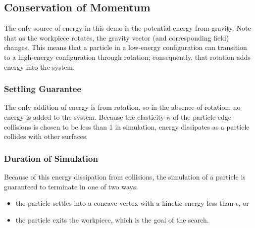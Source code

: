 





	\subsection{Conservation of Momentum}

		The only source of energy in this demo is the potential energy from gravity. Note that as the workpiece rotates, the gravity vector (and corresponding field) changes. This means that a particle in a low-energy configuration can transition to a high-energy configuration through rotation; consequently, that rotation adds energy into the system.

		\subsubsection{Settling Guarantee}

		The only addition of energy is from rotation, so in the absence of rotation, no energy is added to the system. Because the elasticity  $\kappa$ of the particle-edge collisions is chosen to be less than 1 in simulation, energy dissipates as a particle collides with other surfaces.

		\subsubsection{Duration of Simulation}

Because of this energy dissipation from collisions, the simulation of a particle is guaranteed to terminate in one of two ways:

\begin{itemize}
\item the particle settles into a concave vertex with a kinetic energy less than $\epsilon$, or
\item the particle exits the workpiece, which is the goal of the search.
\end{itemize}

